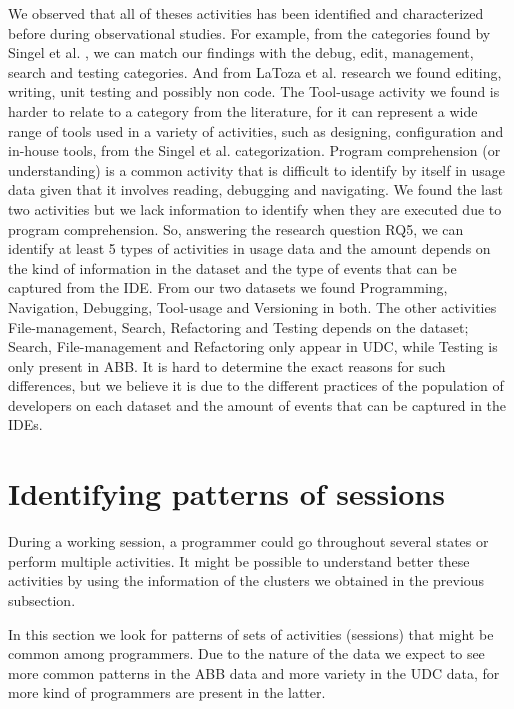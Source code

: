 \begin{changedforreviewerlong}
We observed that all of theses activities has been identified and characterized before during observational studies. For example, from the categories found by Singel et al. \cite{SLV10}, we can match our findings with the debug, edit, management, search and testing categories. And from LaToza et al. \cite{LVD06} research we found editing, writing, unit testing and possibly non code. The Tool-usage activity we found is harder to relate to a category from the literature, for it can represent a wide range of tools used in a variety of activities, such as designing, configuration and in-house tools, from the Singel et al. categorization. Program comprehension (or understanding) is a common activity that is difficult to identify by itself in usage data given that it involves reading, debugging and navigating. We found the last two activities but we lack information to identify when they are executed due to program comprehension. So, answering the research question RQ5, we can identify at least 5 types of activities in usage data and the amount depends on the kind of information in the dataset and the type of events that can be captured from the IDE. From our two datasets we found Programming, Navigation, Debugging, Tool-usage and Versioning in both. The other activities File-management, Search, Refactoring and Testing depends on the dataset; Search, File-management and Refactoring only appear in UDC, while Testing is only present in ABB. It is hard to determine the exact reasons for such differences, but we believe it is due to the different practices of the population of developers on each dataset and the amount of events that can be captured in the IDEs. 
\end{changedforreviewerlong}

\section{Identifying patterns of sessions}
During a working session, a programmer could go throughout several states or perform multiple activities. It might be possible to understand better these activities by using the information of the clusters we obtained in the previous subsection. 

In this section we look for patterns of sets of activities (sessions) that might be common among programmers. Due to the nature of the data we expect to see more common patterns in the ABB data and more variety in the UDC data, for more kind of programmers are present in the latter.

